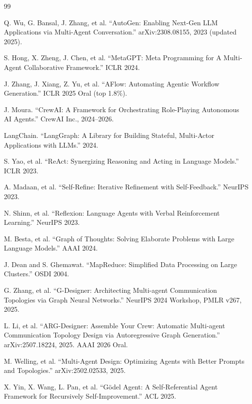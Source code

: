 \documentclass[11pt,a4paper]{article}
\begin{document}
\begin{thebibliography}{99}

Q. Wu, G. Bansal, J. Zhang, et al. ``AutoGen: Enabling Next-Gen LLM Applications via Multi-Agent Conversation.'' arXiv:2308.08155, 2023 (updated 2025).

S. Hong, X. Zheng, J. Chen, et al. ``MetaGPT: Meta Programming for A Multi-Agent Collaborative Framework.'' ICLR 2024.

J. Zhang, J. Xiang, Z. Yu, et al. ``AFlow: Automating Agentic Workflow Generation.'' ICLR 2025 Oral (top 1.8\%).

J. Moura. ``CrewAI: A Framework for Orchestrating Role-Playing Autonomous AI Agents.'' CrewAI Inc., 2024--2026.

LangChain. ``LangGraph: A Library for Building Stateful, Multi-Actor Applications with LLMs.'' 2024.

S. Yao, et al. ``ReAct: Synergizing Reasoning and Acting in Language Models.'' ICLR 2023.

A. Madaan, et al. ``Self-Refine: Iterative Refinement with Self-Feedback.'' NeurIPS 2023.

N. Shinn, et al. ``Reflexion: Language Agents with Verbal Reinforcement Learning.'' NeurIPS 2023.

M. Besta, et al. ``Graph of Thoughts: Solving Elaborate Problems with Large Language Models.'' AAAI 2024.

J. Dean and S. Ghemawat. ``MapReduce: Simplified Data Processing on Large Clusters.'' OSDI 2004.

G. Zhang, et al. ``G-Designer: Architecting Multi-agent Communication Topologies via Graph Neural Networks.'' NeurIPS 2024 Workshop, PMLR v267, 2025.

L. Li, et al. ``ARG-Designer: Assemble Your Crew: Automatic Multi-agent Communication Topology Design via Autoregressive Graph Generation.'' arXiv:2507.18224, 2025. AAAI 2026 Oral.

M. Welling, et al. ``Multi-Agent Design: Optimizing Agents with Better Prompts and Topologies.'' arXiv:2502.02533, 2025.

X. Yin, X. Wang, L. Pan, et al. ``G\"odel Agent: A Self-Referential Agent Framework for Recursively Self-Improvement.'' ACL 2025.


\end{thebibliography}
\end{document}
